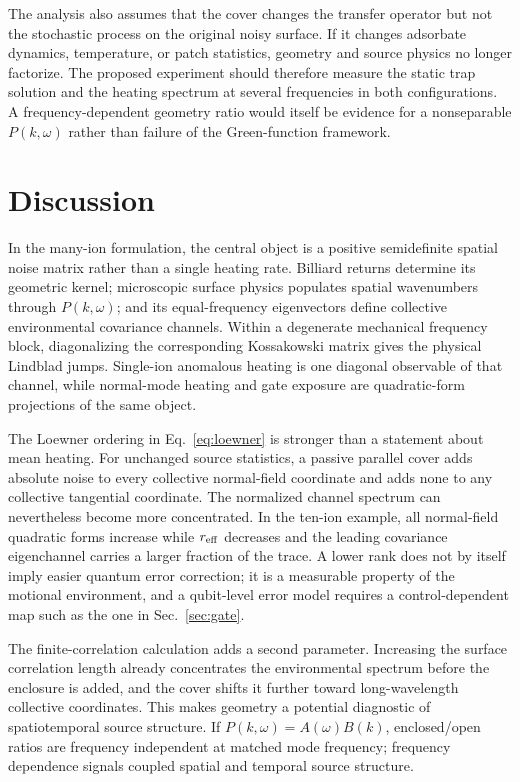 \documentclass[aps,pra,twocolumn,superscriptaddress,longbibliography,nofootinbib,floatfix]{revtex4-2}
\theoremstyle{remark}
\begin{document}
The analysis also assumes that the cover changes the transfer operator but not the stochastic process on the original noisy surface.  If it changes adsorbate dynamics, temperature, or patch statistics, geometry and source physics no longer factorize.  The proposed experiment should therefore measure the static trap solution and the heating spectrum at several frequencies in both configurations.  A frequency-dependent geometry ratio would itself be evidence for a nonseparable $P(k,\omega)$ rather than failure of the Green-function framework.

\section{Discussion}

In the many-ion formulation, the central object is a positive semidefinite spatial noise matrix rather than a single heating rate.  Billiard returns determine its geometric kernel; microscopic surface physics populates spatial wavenumbers through $P(k,\omega)$; and its equal-frequency eigenvectors define collective environmental covariance channels.  Within a degenerate mechanical frequency block, diagonalizing the corresponding Kossakowski matrix gives the physical Lindblad jumps.  Single-ion anomalous heating is one diagonal observable of that channel, while normal-mode heating and gate exposure are quadratic-form projections of the same object.

The Loewner ordering in Eq.~\eqref{eq:loewner} is stronger than a statement about mean heating.  For unchanged source statistics, a passive parallel cover adds absolute noise to every collective normal-field coordinate and adds none to any collective tangential coordinate.  The normalized channel spectrum can nevertheless become more concentrated.  In the ten-ion example, all normal-field quadratic forms increase while $r_{\rm eff}$ decreases and the leading covariance eigenchannel carries a larger fraction of the trace.  A lower rank does not by itself imply easier quantum error correction; it is a measurable property of the motional environment, and a qubit-level error model requires a control-dependent map such as the one in Sec.~\ref{sec:gate}.

The finite-correlation calculation adds a second parameter.  Increasing the surface correlation length already concentrates the environmental spectrum before the enclosure is added, and the cover shifts it further toward long-wavelength collective coordinates.  This makes geometry a potential diagnostic of spatiotemporal source structure.  If $P(k,\omega)=A(\omega)B(k)$, enclosed/open ratios are frequency independent at matched mode frequency; frequency dependence signals coupled spatial and temporal source structure.
\end{document}

